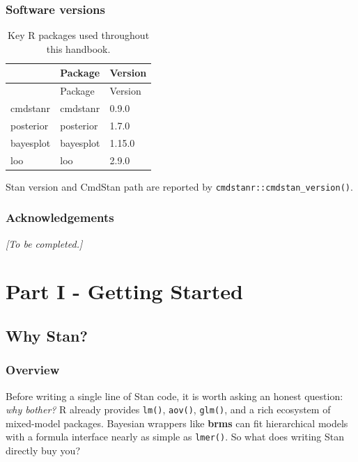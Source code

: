 \documentclass[
  11pt,
  a4paper,
  oneside,
  openany]{scrbook}
\begin{document}
\section*{Software versions}\label{software-versions}


\begin{longtable}[]{@{}lll@{}}
\caption{Key R packages used throughout this handbook.}\tabularnewline
\toprule\noalign{}
& Package & Version \\
\midrule\noalign{}
\endfirsthead
\toprule\noalign{}
& Package & Version \\
\midrule\noalign{}
\endhead
\bottomrule\noalign{}
\endlastfoot
cmdstanr & cmdstanr & 0.9.0 \\
posterior & posterior & 1.7.0 \\
bayesplot & bayesplot & 1.15.0 \\
loo & loo & 2.9.0 \\
\end{longtable}

Stan version and CmdStan path are reported by
\texttt{cmdstanr::cmdstan\_version()}.

\section*{Acknowledgements}\label{acknowledgements}


\emph{{[}To be completed.{]}}

\part{Part I - Getting Started}

\chapter{Why Stan?}\label{why-stan}

\section{Overview}\label{overview}

Before writing a single line of Stan code, it is worth asking an honest
question: \emph{why bother?} R already provides \texttt{lm()},
\texttt{aov()}, \texttt{glm()}, and a rich ecosystem of mixed-model
packages. Bayesian wrappers like \textbf{brms} can fit hierarchical
models with a formula interface nearly as simple as \texttt{lmer()}. So
what does writing Stan directly buy you?
\end{document}
